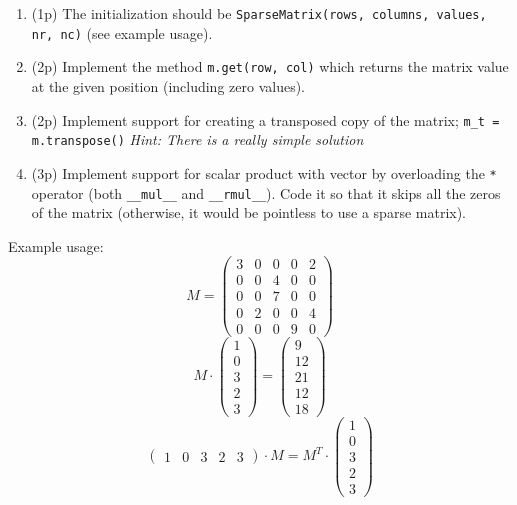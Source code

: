 \documentclass[]{article}
\begin{document}
\begin{enumerate}
\def\labelenumi{\arabic{enumi}.}
\setcounter{enumi}{-1}
\itemsep1pt\parskip0pt
\item
  (1p) The initialization should be
  \texttt{SparseMatrix(rows, columns, values, nr, nc)} (see example
  usage).
\item
  (2p) Implement the method \texttt{m.get(row, col)} which returns the
  matrix value at the given position (including zero values).
\item
  (2p) Implement support for creating a transposed copy of the matrix;
  \texttt{m\_t = m.transpose()} \emph{Hint: There is a really simple
  solution}
\item
  (3p) Implement support for scalar product with vector by overloading
  the \texttt{*} operator (both \texttt{\_\_mul\_\_} and
  \texttt{\_\_rmul\_\_}). Code it so that it skips all the zeros of the
  matrix (otherwise, it would be pointless to use a sparse matrix).
\end{enumerate}

Example usage: \[
M = \begin{pmatrix} 3 & 0 & 0 & 0 & 2 \\ 0 & 0 & 4 & 0 & 0 \\ 0 & 0 & 7 & 0 & 0 \\ 0 & 2 & 0 & 0 & 4 \\ 0 & 0 & 0 & 9 & 0\end{pmatrix}
\] \[
M \cdot \begin{pmatrix} 1 \\ 0 \\ 3 \\ 2 \\ 3\end{pmatrix} = \begin{pmatrix} 9 \\ 12 \\ 21 \\ 12 \\ 18 \end{pmatrix}
\] \[
\begin{pmatrix} 1 & 0 & 3 & 2 & 3 \end{pmatrix} \cdot M =  M^T \cdot \begin{pmatrix} 1 \\ 0 \\ 3 \\ 2 \\ 3 \end{pmatrix}
\]
\end{document}
